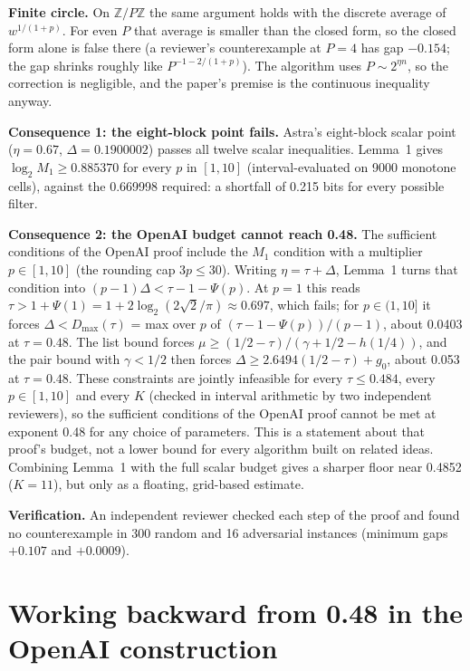 \documentclass[11pt]{article}
\theoremstyle{plain}
\begin{document}
\textbf{Finite circle.} On $\mathbb{Z}/P\mathbb{Z}$ the same argument holds with the discrete average of $w^{1/(1+p)}$. For even $P$ that average is smaller than the closed form, so the closed form alone is false there (a reviewer's counterexample at $P = 4$ has gap $-0.154$; the gap shrinks roughly like $P^{-1-2/(1+p)}$). The algorithm uses $P \sim 2^{\eta n}$, so the correction is negligible, and the paper's premise is the continuous inequality anyway.

\textbf{Consequence 1: the eight-block point fails.} Astra's eight-block scalar point ($\eta = 0.67$, $\Delta = 0.1900002$) passes all twelve scalar inequalities. Lemma~1 gives $\log_2 M_1 \ge 0.885370$ for every $p$ in $[1, 10]$ (interval-evaluated on 9000 monotone cells), against the 0.669998 required: a shortfall of 0.215 bits for every possible filter.

\textbf{Consequence 2: the OpenAI budget cannot reach 0.48.} The sufficient conditions of the OpenAI proof include the $M_1$ condition with a multiplier $p \in [1, 10]$ (the rounding cap $3p \le 30$). Writing $\eta = \tau + \Delta$, Lemma~1 turns that condition into $(p - 1)\Delta < \tau - 1 - \Psi(p)$. At $p = 1$ this reads $\tau > 1 + \Psi(1) = 1 + 2\log_2(2\sqrt2/\pi) \approx 0.697$, which fails; for $p \in (1, 10]$ it forces $\Delta < D_{\max}(\tau)$ = max over $p$ of $(\tau - 1 - \Psi(p))/(p - 1)$, about 0.0403 at $\tau = 0.48$. The list bound forces $\mu \ge (1/2 - \tau)/(\gamma + 1/2 - h(1/4))$, and the pair bound with $\gamma < 1/2$ then forces $\Delta \ge 2.6494(1/2 - \tau) + g_0$, about 0.053 at $\tau = 0.48$. These constraints are jointly infeasible for every $\tau \le 0.484$, every $p \in [1, 10]$ and every $K$ (checked in interval arithmetic by two independent reviewers), so the sufficient conditions of the OpenAI proof cannot be met at exponent 0.48 for any choice of parameters. This is a statement about that proof's budget, not a lower bound for every algorithm built on related ideas. Combining Lemma~1 with the full scalar budget gives a sharper floor near 0.4852 ($K = 11$), but only as a floating, grid-based estimate.

\textbf{Verification.} An independent reviewer checked each step of the proof and found no counterexample in 300 random and 16 adversarial instances (minimum gaps $+0.107$ and $+0.0009$).

\section{Working backward from 0.48 in the OpenAI construction}
\end{document}
